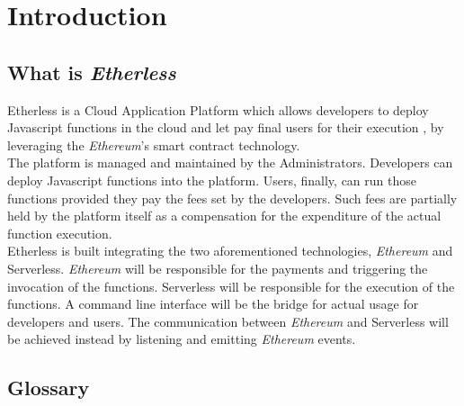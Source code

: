 \section{Introduction}

\subsection{What is \textit{Etherless}}
Etherless is a Cloud Application Platform which allows developers to deploy Javascript functions in the cloud and let pay final users for their execution , by leveraging the \textit{Ethereum}'s smart contract technology.\\
The platform is managed and maintained by the Administrators. 
Developers can deploy Javascript functions into the platform. Users, finally, can run those functions provided they pay the fees set by the developers. Such fees are partially held by the platform itself as a compensation for the expenditure of the actual function execution.\\
Etherless is built integrating the two aforementioned technologies, \textit{Ethereum} and Serverless. \textit{Ethereum} will be responsible for the payments and triggering the invocation of the functions. Serverless will be responsible for the execution of the functions. A command line interface will be the bridge for actual usage for developers and users. The communication between \textit{Ethereum} and Serverless will be achieved instead by listening and emitting \textit{Ethereum} events.

\subsection{Glossary}	